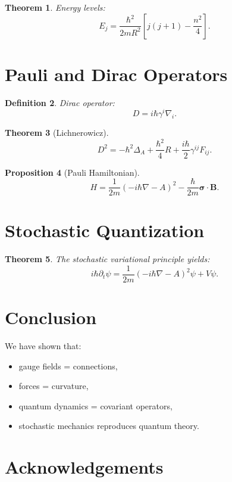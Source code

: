 \documentclass[11pt]{article}
\newtheorem{theorem}{Theorem}[section]
\newtheorem{proposition}[theorem]{Proposition}
\newtheorem{definition}[theorem]{Definition}
\begin{document}
\begin{theorem}
Energy levels:
\[
E_j = \frac{\hbar^2}{2mR^2}\left[j(j+1) - \frac{n^2}{4}\right].
\]
\end{theorem}

\section{Pauli and Dirac Operators}

\begin{definition}
Dirac operator:
\[
D = i\hbar \gamma^i \nabla_i.
\]
\end{definition}

\begin{theorem}[Lichnerowicz]
\[
D^2 = -\hbar^2\Delta_A + \frac{\hbar^2}{4}R + \frac{i\hbar}{2}\gamma^{ij}F_{ij}.
\]
\end{theorem}

\begin{proposition}[Pauli Hamiltonian]
\[
H = \frac{1}{2m}(-i\hbar\nabla - A)^2 - \frac{\hbar}{2m}\bm{\sigma}\cdot\bm{B}.
\]
\end{proposition}

\section{Stochastic Quantization}

\begin{theorem}
The stochastic variational principle yields:
\[
i\hbar \partial_t \psi =
\frac{1}{2m}(-i\hbar\nabla - A)^2 \psi + V\psi.
\]
\end{theorem}

\section{Conclusion}

We have shown that:
\begin{itemize}
\item gauge fields = connections,
\item forces = curvature,
\item quantum dynamics = covariant operators,
\item stochastic mechanics reproduces quantum theory.
\end{itemize}

\section*{Acknowledgements}
\end{document}
